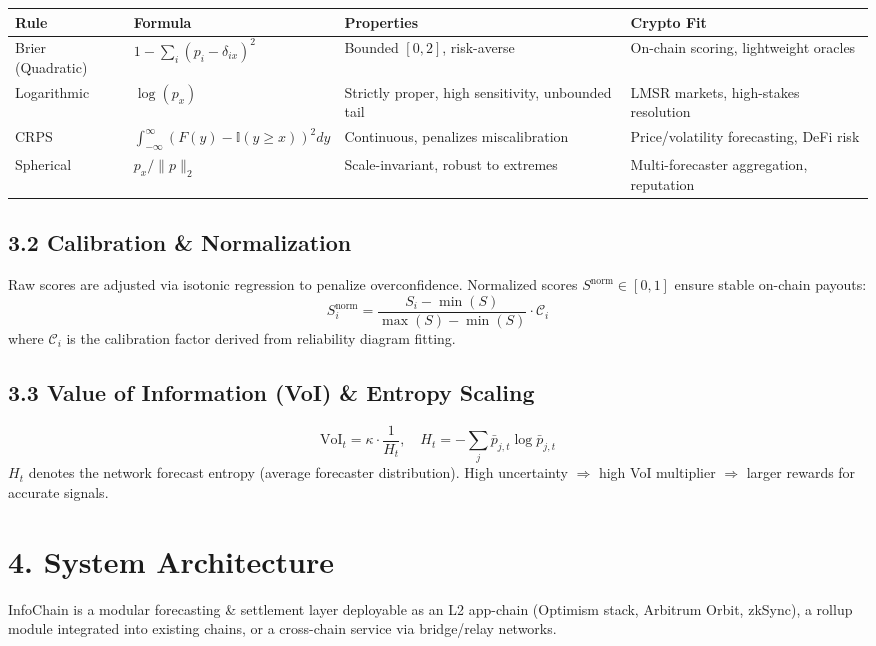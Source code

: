 \documentclass[11pt,a4paper]{article}
\begin{document}
\begin{center}
\begin{tabularx}{\textwidth}{@{}lXXl@{}}
\toprule
\textbf{Rule} & \textbf{Formula} & \textbf{Properties} & \textbf{Crypto Fit} \\
\midrule
Brier (Quadratic) & $1 - \sum_i (p_i - \delta_{ix})^2$ & Bounded $[0,2]$, risk-averse & On-chain scoring, lightweight oracles \\
Logarithmic & $\log(p_x)$ & Strictly proper, high sensitivity, unbounded tail & LMSR markets, high-stakes resolution \\
CRPS & $\int_{-\infty}^{\infty} (F(y) - \mathbb{I}(y \geq x))^2 dy$ & Continuous, penalizes miscalibration & Price/volatility forecasting, DeFi risk \\
Spherical & $p_x / \|p\|_2$ & Scale-invariant, robust to extremes & Multi-forecaster aggregation, reputation \\
\bottomrule
\end{tabularx}
\end{center}

\subsection*{3.2 Calibration \& Normalization}
Raw scores are adjusted via isotonic regression to penalize overconfidence. Normalized scores $S^{\text{norm}} \in [0,1]$ ensure stable on-chain payouts:
\begin{equation}
S_i^{\text{norm}} = \frac{S_i - \min(S)}{\max(S) - \min(S)} \cdot \mathcal{C}_i
\end{equation}
where $\mathcal{C}_i$ is the calibration factor derived from reliability diagram fitting.

\subsection*{3.3 Value of Information (VoI) \& Entropy Scaling}
\begin{equation}
\text{VoI}_t = \kappa \cdot \frac{1}{H_t}, \quad H_t = -\sum_j \bar{p}_{j,t} \log \bar{p}_{j,t}
\end{equation}
$H_t$ denotes the network forecast entropy (average forecaster distribution). High uncertainty $\Rightarrow$ high VoI multiplier $\Rightarrow$ larger rewards for accurate signals.

\section*{4. System Architecture}
InfoChain is a modular forecasting \& settlement layer deployable as an L2 app-chain (Optimism stack, Arbitrum Orbit, zkSync), a rollup module integrated into existing chains, or a cross-chain service via bridge/relay networks.
\end{document}
